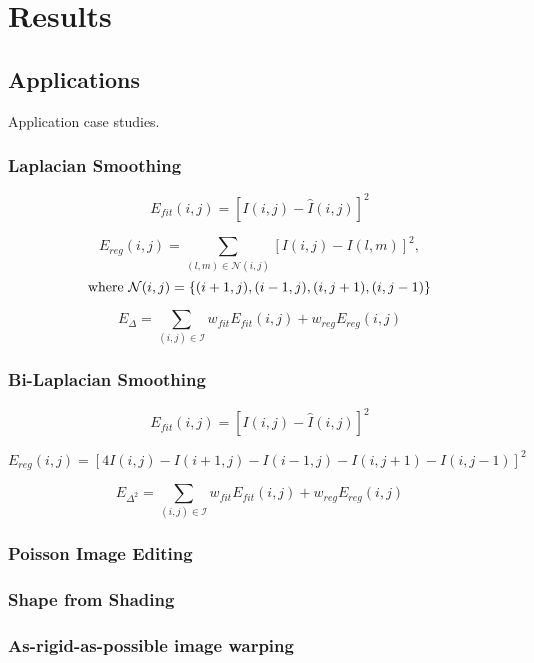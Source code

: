 \section{Results}
\label{sec:results}

\subsection{Applications}
\label{sec:apps}
Application case studies.

\subsubsection{Laplacian Smoothing} 
$$E_{\mathit{fit}}(i,j) = [I(i,j) - \hat{I}(i,j) ]^2$$

$$E_{\mathit{reg}}(i,j) = \sum_{(l,m) \in \mathcal{N}(i,j)} [I(i,j) - I(l,m) ]^2,$$
$$\textnormal{where}\ \mathcal{N}(i,j) = \{(i+1,j), (i-1,j), (i,j+1), (i,j-1)\}$$

$$E_{\Delta} = \sum_{(i,j) \in \mathcal{I}} w_{\mathit{fit}} E_{\mathit{fit}}(i,j) + w_{\mathit{reg}} E_{\mathit{reg}}(i,j)$$

\subsubsection{Bi-Laplacian Smoothing}

$$E_{\mathit{fit}}(i,j) = [I(i,j) - \hat{I}(i,j) ]^2$$

$$E_{\mathit{reg}}(i,j) = [4 I(i,j) - I(i+1,j) - I(i-1,j) - I(i,j+1) - I(i,j-1)]^2$$

$$E_{\Delta^2} = \sum_{(i,j) \in \mathcal{I}} w_{\mathit{fit}} E_{\mathit{fit}}(i,j) + w_{\mathit{reg}} E_{\mathit{reg}}(i,j)$$

\subsubsection{Poisson Image Editing}

\cite{perez2003poisson}

\subsubsection{Shape from Shading}

\cite{wu2014sfs}

\subsubsection{As-rigid-as-possible image warping}


